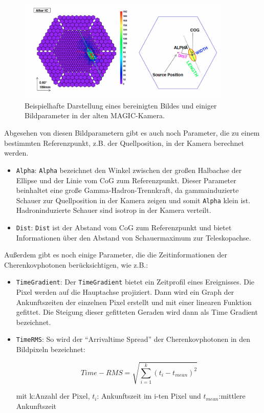 \begin{figure}
    \centering
    \includegraphics[width=0.9\textwidth]{./Plots/03_MonteCarlos/CleaningBild.png}
    \caption{Beispielhafte Darstellung eines bereinigten Bildes und einiger Bildparameter in der alten MAGIC-Kamera.\cite{ImageCleaning}}
    \label{CleaningBild}
\end{figure}

Abgesehen von diesen Bildparametern gibt es auch noch Parameter, die zu einem bestimmten Referenzpunkt, z.B. der Quellposition, in der Kamera berechnet werden. 

\begin{itemize}
 \item \texttt{Alpha}: \texttt{Alpha} bezeichnet den Winkel zwischen der großen Halbachse der Ellipse und der Linie vom CoG zum Referenzpunkt.
 Dieser Parameter beinhaltet eine große Gamma-Hadron-Trennkraft, da gammainduzierte Schauer zur Quellposition in der Kamera zeigen und somit \texttt{Alpha} klein ist.
 Hadroninduzierte Schauer sind isotrop in der Kamera verteilt.
 \item \texttt{Dist}: \texttt{Dist} ist der Abstand vom CoG zum Referenzpunkt und bietet Informationen über den Abstand von Schauermaximum zur Teleskopachse.
\end{itemize}

Außerdem gibt es noch einige Parameter, die die Zeitinformationen der Cherenkovphotonen berücksichtigen, wie z.B.:

\begin{itemize}
 \item \texttt{TimeGradient}: Der \texttt{TimeGradient} bietet ein Zeitprofil eines Ereignisses.
 Die Pixel werden auf die Hauptachse projiziert.
 Dann wird ein Graph der Ankunftszeiten der einzelnen Pixel erstellt und mit einer linearen Funktion gefittet.
 Die Steigung dieser gefitteten Geraden wird dann als Time Gradient bezeichnet.
 \item \texttt{TimeRMS}: So wird der ``Arrivaltime Spread'' der Cherenkovphotonen in den Bildpixeln bezeichnet:
 
\begin{equation}
 Time-RMS=\sqrt{\sum_{i=1}^k (t_i-t_{mean})^2}
\end{equation}
 \begin{centering}
  \small{mit k:Anzahl der Pixel, $t_i$: Ankunftszeit im i-ten Pixel und $t_{mean}$:mittlere Ankunftszeit}
 \end{centering}


\end{itemize}


